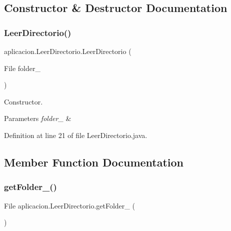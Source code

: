 \subsection{Constructor \& Destructor Documentation}
\hypertarget{classaplicacion_1_1_leer_directorio_a02169b5b69017ed66a63b94f9bd7a2ad}{}\label{classaplicacion_1_1_leer_directorio_a02169b5b69017ed66a63b94f9bd7a2ad} 
\subsubsection{\texorpdfstring{Leer\+Directorio()}{LeerDirectorio()}}
{\footnotesize\ttfamily aplicacion.\+Leer\+Directorio.\+Leer\+Directorio (\begin{DoxyParamCaption}\item[{File}]{folder\+\_\+ }\end{DoxyParamCaption})}

Constructor. 
\begin{DoxyParams}{Parameters}
{\em folder\+\_\+} & \\
\hline
\end{DoxyParams}


Definition at line 21 of file Leer\+Directorio.\+java.



\subsection{Member Function Documentation}
\hypertarget{classaplicacion_1_1_leer_directorio_aa9db3677912609ea74f9b21c654c6ad8}{}\label{classaplicacion_1_1_leer_directorio_aa9db3677912609ea74f9b21c654c6ad8} 
\subsubsection{\texorpdfstring{get\+Folder\+\_\+()}{getFolder\_()}}
{\footnotesize\ttfamily File aplicacion.\+Leer\+Directorio.\+get\+Folder\+\_\+ (\begin{DoxyParamCaption}{ }\end{DoxyParamCaption})}


